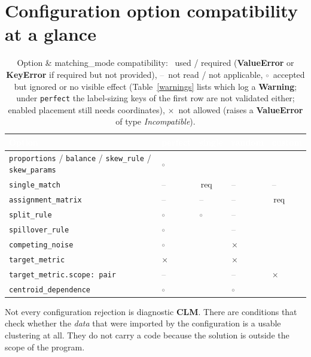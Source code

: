 \documentclass[a4paper,11pt]{article}
\newcommand{\vcode}[1]{\textcolor{valred}{\bfseries\ttfamily #1}}
\newcommand{\cok}{\textcolor{okgreen}{\checkmark}}
\newcommand{\cign}{\textcolor{gray}{$\circ$}}
\newcommand{\cno}{\textcolor{valred}{$\times$}}
\newcommand{\cna}{\textcolor{gray}{--}}
\newcommand{\headrow}{\rowcolor{headblue}}
\newcommand{\hc}[1]{\textcolor{white}{\bfseries #1}}
\begin{document}
\section{Configuration option compatibility at a glance}
\begin{table}[!h]
\centering\small
\begin{threeparttable}
\begin{tabular}{@{}L{4.9cm} *{4}{>{\centering\arraybackslash}p{1.9cm}}@{}}
\toprule
\headrow
\hc{Option} & \hc{perfect} & \hc{single} & \hc{random} & \hc{custom} \\
\midrule
\texttt{proportions} / \texttt{balance} / \texttt{skew\_rule} / \texttt{skew\_params} & \cign & \cok & \cok & \cok \\
\texttt{single\_match} & \cna & \cok\,req & \cna & \cna \\
\texttt{assignment\_matrix} & \cna & \cna & \cna & \cok\,req \\
\texttt{split\_rule} & \cign & \cign & \cna & \cok \\
\texttt{spillover\_rule} & \cign & \cok & \cna & \cok \\
\texttt{competing\_noise} & \cign & \cok & \cno & \cok \\
\texttt{target\_metric} & \cno & \cok & \cno & \cok \\
\texttt{target\_metric.scope: pair} & \cna & \cok & \cna & \cno \\
\texttt{centroid\_dependence} & \cign & \cok & \cign & \cok \\
\bottomrule
\end{tabular}
\caption{Option \& matching\_mode compatibility: \cok~used / required (\textbf{ValueError} or \textbf{KeyError} if required but not provided), \cna~not read / not applicable, \cign~accepted but ignored or no visible effect (Table~\ref{warnings} lists which log a \textbf{Warning}; under \texttt{perfect} the label-sizing keys of the first row are not validated either; enabled placement still needs coordinates), \cno~not allowed (raises a \textbf{ValueError} of type \textit{Incompatible}).}
\end{threeparttable}
\end{table}

\noindent Not every configuration rejection is diagnostic \vcode{CLM}. There are conditions that check whether the \emph{data} that were imported by the configuration is a usable clustering at all. They do not carry a code because the solution is outside the scope of the program.
\end{document}
